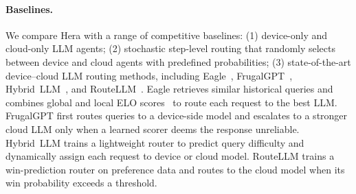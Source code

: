\documentclass{article}
\newcommand{\needrev}[1]{{\color{darkgreen}#1}} %
\newcommand{\needrev}[1]{#1} %
\newcommand{\name}{Hera\xspace}
\begin{document}

\vspace{-.5em}
\paragraph{Baselines.}
We compare \name with a range of competitive baselines: 
(1) device-only and cloud-only LLM agents;
(2) stochastic step-level routing that randomly selects between device and cloud agents with predefined probabilities;
(3) state-of-the-art device--cloud LLM routing methods, including Eagle~\citep{Eagle2024}, FrugalGPT~\citep{chen2024frugalgpt}, Hybrid~LLM~\citep{ding2024hybrid}, and RouteLLM~\citep{ongroutellm}.
Eagle retrieves similar historical queries and combines global and local ELO scores~\citep{elo1967proposed} to route each request to the best LLM.
FrugalGPT first routes queries to a device-side model and escalates to a stronger cloud LLM only when a learned scorer deems the response unreliable.
Hybrid~LLM trains a lightweight router to predict query difficulty and dynamically assign each request to device or cloud model.
RouteLLM trains a win-prediction router on preference data and routes to the cloud model when its win probability exceeds a threshold.

\vspace{-.5em}
\end{document}
